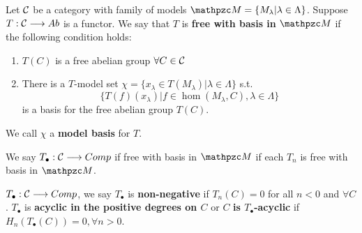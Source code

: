 \documentclass[11pt]{book} %
\begin{document}
\begin{definition}
Let ${\cal C}$ be a category with family of models $\pzm=\{M_\lambda|\lambda\in \Lambda\}$. Suppose $T:{\cal C}\longrightarrow Ab$ is a functor. We say that $T$ is \textbf{free with basis in} $\pzm$ if the following condition holds:
\begin{enumerate}
\item $T(C)$ is a free abelian group $\forall C\in {\cal C}$
\item There is a $T$-model set $\chi=\{x_\lambda\in T(M_\lambda)|\lambda\in \Lambda\}$ s.t.
$$
\{T(f)(x_\lambda)|f\in \hom(M_\lambda,C), \lambda\in \Lambda\}
$$
is a basis for the free abelian group $T(C)$.
\end{enumerate}
We call $\chi$ a \textbf{model basis} for $T$.
\end{definition}
We say $T_\bullet:{\cal C}\longrightarrow Comp$ if free with basis in $\pzm$ if each $T_n$ is free with basis in $\pzm$.

\begin{definition}
$T_\bullet:{\cal C}\longrightarrow Comp$, we say $T_\bullet$ is \textbf{non-negative} if $T_n(C)=0$ for all $n<0$ and $\forall C$. $T_\bullet$ is \textbf{acyclic in the positive degrees on $C$} or $C$ \textbf{is $T_\bullet$-acyclic } if $H_n(T_\bullet(C))=0,\forall n>0$. 
\end{definition}
\end{document}

